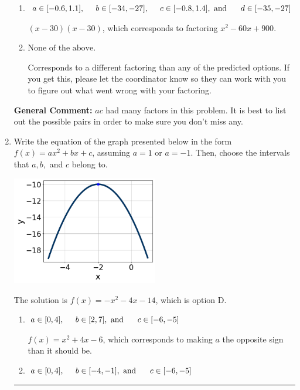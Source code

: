 \documentclass{extbook}[14pt]
\newcommand{\litem}[1]{\item #1

\rule{\textwidth}{0.4pt}}
\begin{document}
\begin{enumerate}
{\begin{enumerate}[label=\Alph*.]
 $(12x -5)(3x -5)$, which corresponds to associating some factor of a to c.
\item \( a \in [-0.6, 1.1], \hspace*{5mm} b \in [-34, -27], \hspace*{5mm} c \in [-0.8, 1.4], \text{ and } \hspace*{5mm} d \in [-35, -27] \)

 $(x -30)(x -30)$, which corresponds to factoring $x^{2} -60 x + 900$.
\item \( \text{None of the above.} \)

 Corresponds to a different factoring than any of the predicted options. If you get this, please let the coordinator know so they can work with you to figure out what went wrong with your factoring.
\end{enumerate}

\textbf{General Comment:} $ac$ had many factors in this problem. It is best to list out the possible pairs in order to make sure you don't miss any.
}
\litem{
Write the equation of the graph presented below in the form $f(x)=ax^2+bx+c$, assuming  $a=1$ or $a=-1$. Then, choose the intervals that $a, b,$ and $c$ belong to.

\begin{center}
    \includegraphics[width=0.5\textwidth]{../Figures/quadraticGraphToEquationA.png}
\end{center}


The solution is \( f(x) = -x^{2} -4 x -14 \), which is option D.\begin{enumerate}[label=\Alph*.]
\item \( a \in [0, 4], \hspace*{5mm} b \in [2, 7], \text{ and } \hspace*{5mm} c \in [-6, -5] \)

$f(x)=x^{2} +4 x -6$, which corresponds to making $a$ the opposite sign than it should be.
\item \( a \in [0, 4], \hspace*{5mm} b \in [-4, -1], \text{ and } \hspace*{5mm} c \in [-6, -5] \)


\end{enumerate}}
\end{enumerate}
\end{document}
